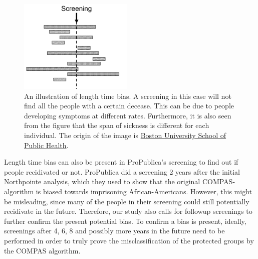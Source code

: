 \documentclass[11pt, fleqn, titlepage]{article}
\begin{document}
	\begin{figure}[H]
		\centering
		\includegraphics[width=0.3\linewidth]{imgs/length}
		\caption{An illustration of length time bias. A screening in this case will not find all the people with a certain decease. This can be due to people developing symptoms at different rates. Furthermore, it is also seen from the figure that the span of sickness is different for each individual. The origin of the image is \href{http://sphweb.bumc.bu.edu/otlt/MPH-Modules/EP/EP713_Screening/EP713_Screening8.html}{Boston University School of Public Health}. }
		\label{fig:length}
	\end{figure}
	\noindent
	Length time bias can also be present in ProPublica's screening to find out if people recidivated or not. ProPublica did a screening 2 years after the initial Northpointe analysis, which they used to show that the original COMPAS-algorithm is biased towards imprisoning African-Americans. However, this might be misleading, since many of the people in their screening could still potentially recidivate in the future. Therefore, our study also calls for followup screenings to further confirm the present potential bias. To confirm a bias is present, ideally, screenings after 4, 6, 8 and possibly more years in the future need to be performed in order to truly prove the misclassification of the protected groups by the COMPAS algorithm.
	
\end{document}
